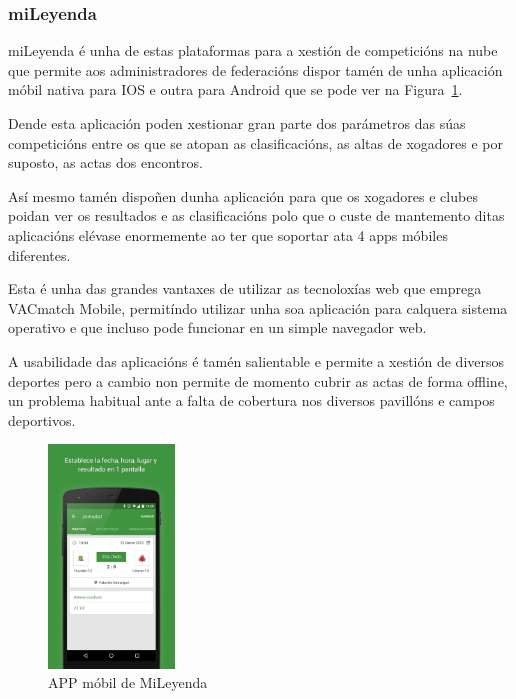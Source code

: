     \subsubsection{miLeyenda}

    miLeyenda é unha de estas plataformas para a xestión de competicións na 
nube que permite aos administradores de federacións dispor tamén de unha 
aplicación móbil nativa para IOS e outra para Android que se pode ver na 
Figura~\ref{fig:img:mileyenda}.

    Dende esta aplicación poden xestionar gran parte dos parámetros das súas competicións 
entre os que se atopan as clasificacións, as altas de xogadores e por 
suposto, as actas dos encontros.

    Así mesmo tamén dispoñen dunha aplicación para que os xogadores e clubes poidan ver 
os resultados e as clasificacións polo que o custe de mantemento ditas 
aplicacións elévase enormemente ao ter que soportar ata 4 apps móbiles 
diferentes.

    Esta é unha das grandes vantaxes de utilizar as tecnoloxías web que emprega VACmatch 
Mobile, permitíndo utilizar unha soa aplicación para calquera sistema 
operativo e que incluso pode funcionar en un simple navegador web.

    A usabilidade das aplicacións é tamén salientable e permite a xestión de 
diversos deportes pero a cambio non permite de momento cubrir as actas de forma 
offline, un problema habitual ante a falta de cobertura nos diversos pavillóns e 
campos deportivos.

      \begin{figure}[h!]
	\begin{center}
	  \includegraphics[width=0.3\textwidth]{./img/mileyenda-app.png}
	  \caption{APP móbil de MiLeyenda}
	  \label{fig:img:mileyenda}
	\end{center}
      \end{figure}

